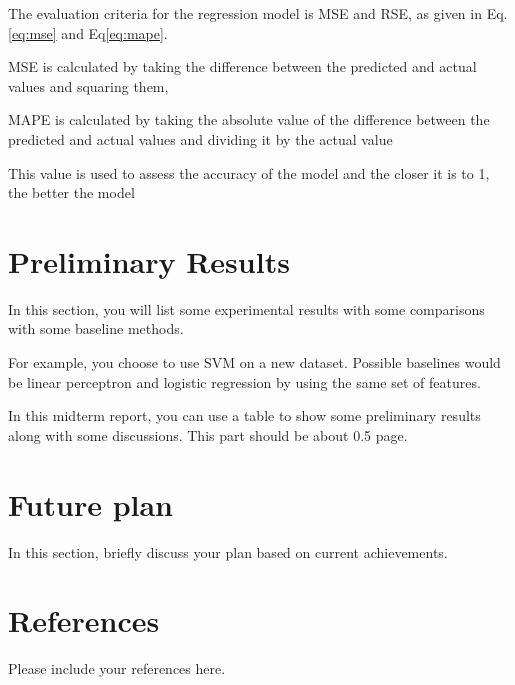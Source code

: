 \documentclass[11pt]{article}
\begin{document}
The evaluation criteria for the regression model is MSE and RSE, as given in Eq. \ref{eq:mse} and Eq\ref{eq:mape}.

MSE is calculated by taking the difference between the
predicted and actual values and squaring them,

MAPE is calculated by taking the absolute value of the difference
between the predicted and actual values and dividing it by the actual
value

This value is used to assess the
accuracy of the model and the closer it is to 1, the better the model



\section{Preliminary Results}

In this section, you will list some experimental results with
some comparisons with some baseline methods.

For example, you choose to use SVM on a new dataset. Possible
baselines would be linear perceptron and logistic regression by
using the same set of features.

In this midterm report, you can use a table to show some
preliminary results along with some discussions. This part should
be about 0.5 page.



\section{Future plan}

In this section, briefly discuss your plan based on current
achievements.

\section{References}

Please include your references here.
\end{document}
